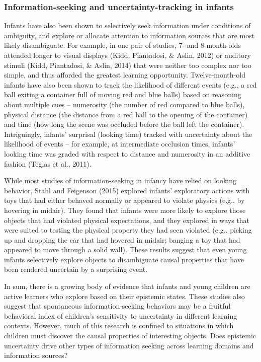 \documentclass[a4paper,man,apacite,floatsintext]{apa6}
\begin{document}
\subsubsection{Information-seeking and uncertainty-tracking in
infants}\label{information-seeking-and-uncertainty-tracking-in-infants}

Infants have also been shown to selectively seek information under
conditions of ambiguity, and explore or allocate attention to
information sources that are most likely disambiguate. For example, in
one pair of studies, 7- and 8-month-olds attended longer to visual
displays (Kidd, Piantadosi, \& Aslin, 2012) or auditory stimuli (Kidd,
Piantadosi, \& Aslin, 2014) that were neither too complex nor too
simple, and thus afforded the greatest learning opportunity.
Twelve-month-old infants have also been shown to track the likelihood of
different events (e.g., a red ball exiting a container full of moving
red and blue balls) based on reasoning about multiple cues -- numerosity
(the number of red compared to blue balls), physical distance (the
distance from a red ball to the opening of the container) and time (how
long the scene was occluded before the ball left the container).
Intriguingly, infants' surprisal (looking time) tracked with uncertainty
about the likelihood of events -- for example, at intermediate occlusion
times, infants' looking time was graded with respect to distance and
numerosity in an additive fashion (Teglas et al., 2011).

While most studies of information-seeking in infancy have relied on
looking behavior, Stahl and Feigenson (2015) explored infants'
exploratory actions with toys that had either behaved normally or
appeared to violate physics (e.g., by hovering in midair). They found
that infants were more likely to explore those objects that had violated
physical expectations, and they explored in ways that were suited to
testing the physical property they had seen violated (e.g., picking up
and dropping the car that had hovered in midair; banging a toy that had
appeared to move through a solid wall). These results suggest that even
young infants selectively explore objects to disambiguate causal
properties that have been rendered uncertain by a surprising event.

In sum, there is a growing body of evidence that infants and young
children are active learners who explore based on their epistemic
states. These studies also suggest that spontaneous information-seeking
behaviors may be a fruitful behavioral index of children's sensitivity
to uncertainty in different learning contexts. However, much of this
research is confined to situations in which children must discover the
causal properties of interesting objects. Does epistemic uncertainty
drive other types of information seeking across learning domains and
information sources?
\end{document}
